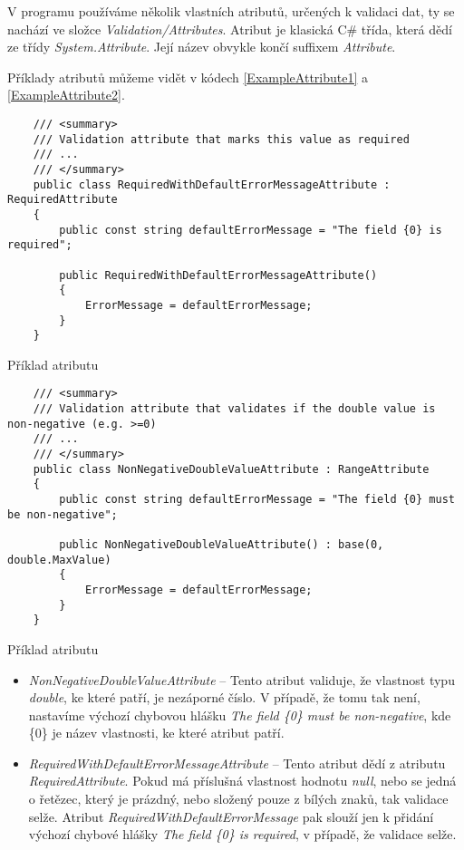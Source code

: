 V programu používáme několik vlastních atributů, určených k validaci dat, ty se nachází ve složce \textit{Validation/Attributes}.
Atribut je klasická C\# třída, která dědí ze třídy \textit{System.Attribute}. Její název obvykle končí suffixem \textit{Attribute}.

Příklady atributů můžeme vidět v kódech \ref{ExampleAttribute1} a \ref{ExampleAttribute2}.

\begin{program}
	\begin{lstlisting}
	/// <summary>
	/// Validation attribute that marks this value as required
	/// ...
	/// </summary>
	public class RequiredWithDefaultErrorMessageAttribute : RequiredAttribute
	{
		public const string defaultErrorMessage = "The field {0} is required";
		
		public RequiredWithDefaultErrorMessageAttribute()
		{
			ErrorMessage = defaultErrorMessage;
		}
	}
	\end{lstlisting}
	\caption{Příklad atributu}
	\label{ExampleAttribute1}
\end{program}

\begin{program}
	\begin{lstlisting}
	/// <summary>
	/// Validation attribute that validates if the double value is non-negative (e.g. >=0)
	/// ...
	/// </summary>
	public class NonNegativeDoubleValueAttribute : RangeAttribute
	{
		public const string defaultErrorMessage = "The field {0} must be non-negative";
		
		public NonNegativeDoubleValueAttribute() : base(0, double.MaxValue)
		{
			ErrorMessage = defaultErrorMessage;
		}
	}
	\end{lstlisting}
	\caption{Příklad atributu}
	\label{ExampleAttribute2}
\end{program}

\begin{itemize}
\item \textit{NonNegativeDoubleValueAttribute} -- Tento atribut validuje, že vlastnost ty\-pu \textit{double}, ke které patří, je nezáporné číslo. V případě, že tomu tak není, nastavíme výchozí chybovou hlášku \textit{The field \{0\} must be non-negative}, kde \{0\} je název vlastnosti, ke které atribut patří.

\item \textit{RequiredWithDefaultErrorMessageAttribute} -- Tento atribut dědí z atributu \textit{RequiredAttribute}. Pokud má příslušná vlastnost hodnotu \textit{null}, nebo se jedná o řetězec, který je prázdný, nebo složený pouze z bílých znaků, tak validace selže. Atribut \textit{RequiredWithDefaultErrorMessage} pak slouží jen k přidání výchozí chybové hlášky \textit{The field \{0\} is required}, v případě, že validace selže.

\end{itemize}

